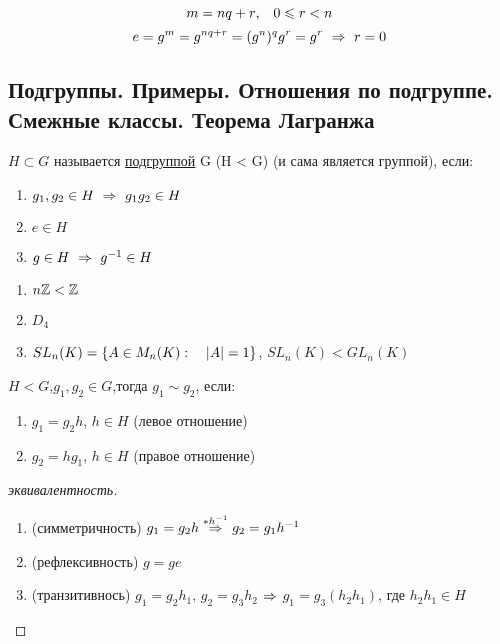 \documentclass[main]{subfiles}
\begin{document}
    \begin{Proof}
        \[m=n q+r$,\q $0 \leqslant r < n\]
        \[e=g^m=g^{n q + r}=(g^n)^q g^r=g^r \ \Rightarrow\  r=0\]
    \end{Proof}

    \newpage
    \subsection{Подгруппы. Примеры. Отношения по подгруппе. Смежные классы. Теорема Лагранжа}

    \begin{definition}
        $H \subset G$ называется \ul{подгруппой} G (H < G) (и сама является группой), если:
        \begin{enumerate}
        	\item $g_1,g_2 \in H \ \Rightarrow\  g_1 g_2 \in H$
        	\item $e \in H$
        	\item $g \in H \ \Rightarrow\  g^{-1} \in H$
    	\end{enumerate}
    \end{definition}

    \begin{examples}
        \begin{enumerate}
        	\item $n\mathbb{Z} < \mathbb{Z}$
        	\item $D_4$
        	\item $SL_n(K)=\{A \in M_n(K): \quad |A|=1\}$, $SL_n(K)<GL_n(K)$
    	\end{enumerate}
    \end{examples}

    \begin{definition}
        $H<G$,\q $g_1,g_2 \in G$,\q тогда $g_1 \sim g_2$, если:
        \begin{enumerate}
        	\item $g_1=g_2 h$, $h \in H$ (левое отношение)
        	\item $g_2=h g_1$, $h \in H$ (правое отношение)
    	\end{enumerate}
    \end{definition}

    \begin{proof}[эквивалентность]
        \begin{enumerate}
        	\item (симметричность) $g_1=g_2 h \overset{*h^{-1}}{\Rightarrow} g_2 = g_1 h^{-1}$
        	\item (рефлексивность) $g=ge$
        	\item (транзитивнось) $g_1=g_2 h_1$, $g_2 = g_3 h_2$ $\Rightarrow$ $g_1=g_3(h_2 h_1)$, где $h_2 h_1 \in H$
    	\end{enumerate}
    \end{proof}
\end{document}
